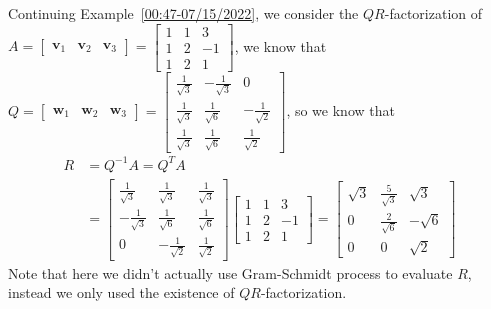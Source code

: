 \documentclass{beamer}
\theoremstyle{definition}
\theoremstyle{remark}
\begin{document}
\begin{frame}[t]
\begin{example}
Continuing Example~\ref{00:47-07/15/2022}, we consider the $QR$-factorization of $A=\begin{bmatrix}
\mathbf v_1&\mathbf v_2&\mathbf v_3
\end{bmatrix}=\begin{bmatrix}
1&1&3\\
1&2&-1\\
1&2&1
\end{bmatrix}$\pause, we know that $Q=\begin{bmatrix}
\mathbf w_1&\mathbf w_2&\mathbf w_3
\end{bmatrix}=\begin{bmatrix}
\frac{1}{\sqrt3}&-\frac{1}{\sqrt3}&0\\
\frac{1}{\sqrt3}&\frac{1}{\sqrt6}&-\frac{1}{\sqrt2}\\
\frac{1}{\sqrt3}&\frac{1}{\sqrt6}&\frac{1}{\sqrt2}
\end{bmatrix}$\pause, so we know that
\begin{align*}
R&=Q^{-1}A=Q^TA\\
&=\begin{bmatrix}
\frac{1}{\sqrt3}&\frac{1}{\sqrt3}&\frac{1}{\sqrt3}\\
-\frac{1}{\sqrt3}&\frac{1}{\sqrt6}&\frac{1}{\sqrt6}\\
0&-\frac{1}{\sqrt2}&\frac{1}{\sqrt2}
\end{bmatrix}\begin{bmatrix}
1&1&3\\
1&2&-1\\
1&2&1
\end{bmatrix}=\begin{bmatrix}
\sqrt3&\frac{5}{\sqrt3}&\sqrt3\\
0&\frac{2}{\sqrt6}&-\sqrt6\\
0&0&\sqrt2
\end{bmatrix}
\end{align*}\pause
Note that here we didn't actually use Gram-Schmidt process to evaluate $R$, instead we only used the existence of $QR$-factorization.
\end{example}
\end{frame}
\end{document}
